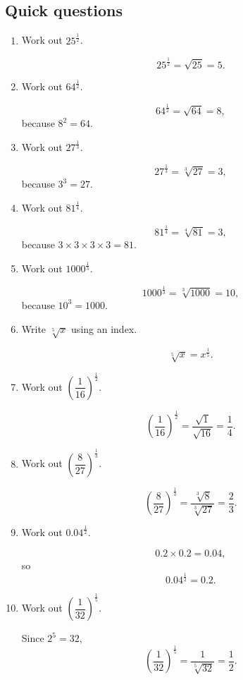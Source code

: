 \documentclass[11pt]{article}
\begin{document}
\subsection*{Quick questions}
\begin{enumerate}
\item Work out $25^{\frac{1}{2}}$.

\[
25^{\frac{1}{2}}=\sqrt{25}=5.
\]

\item Work out $64^{\frac{1}{2}}$.

\[
64^{\frac{1}{2}}=\sqrt{64}=8,
\]
because $8^2=64$.

\item Work out $27^{\frac{1}{3}}$.

\[
27^{\frac{1}{3}}=\sqrt[3]{27}=3,
\]
because $3^3=27$.

\item Work out $81^{\frac{1}{4}}$.

\[
81^{\frac{1}{4}}=\sqrt[4]{81}=3,
\]
because $3\times3\times3\times3=81$.

\item Work out $1000^{\frac{1}{3}}$.

\[
1000^{\frac{1}{3}}=\sqrt[3]{1000}=10,
\]
because $10^3=1000$.

\item Write $\sqrt[5]{x}$ using an index.

\[
\sqrt[5]{x}=x^{\frac{1}{5}}.
\]

\item Work out $\left(\dfrac{1}{16}\right)^{\frac{1}{2}}$.

\[
\left(\frac{1}{16}\right)^{\frac{1}{2}}
=\frac{\sqrt{1}}{\sqrt{16}}
=\frac{1}{4}.
\]

\item Work out $\left(\dfrac{8}{27}\right)^{\frac{1}{3}}$.

\[
\left(\frac{8}{27}\right)^{\frac{1}{3}}
=\frac{\sqrt[3]{8}}{\sqrt[3]{27}}
=\frac{2}{3}.
\]

\item Work out $0.04^{\frac{1}{2}}$.

\[
0.2\times0.2=0.04,
\]
so
\[
0.04^{\frac{1}{2}}=0.2.
\]

\item Work out $\left(\dfrac{1}{32}\right)^{\frac{1}{5}}$.

Since $2^5=32$,
\[
\left(\frac{1}{32}\right)^{\frac{1}{5}}
=\frac{1}{\sqrt[5]{32}}
=\frac{1}{2}.
\]
\end{enumerate}
\end{document}
